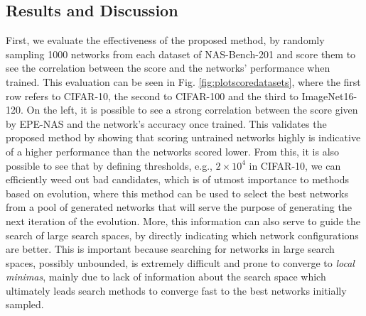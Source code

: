 \documentclass[10pt, conference]{IEEEtran}
\begin{document}
\subsection{Results and Discussion}
First, we evaluate the effectiveness of the proposed method, by randomly sampling 1000 networks from each dataset of NAS-Bench-201 and score them to see the correlation between the score and the networks' performance when trained. This evaluation can be seen in Fig. \ref{fig:plotscoredatasets}, where the first row refers to CIFAR-10, the second to CIFAR-100 and the third to ImageNet16-120. On the left, it is possible to see a strong correlation between the score given by EPE-NAS and the network's accuracy once trained. This validates the proposed method by showing that scoring untrained networks highly is indicative of a higher performance than the networks scored lower. From this, it is also possible to see that by defining thresholds, e.g., $2\times10^4$ in CIFAR-10, we can efficiently weed out bad candidates, which is of utmost importance to methods based on evolution, where this method can be used to select the best networks from a pool of generated networks that will serve the purpose of generating the next iteration of the evolution. More, this information can also serve to guide the search of large search spaces, by directly indicating which network configurations are better. This is important because searching for networks in large search spaces, possibly unbounded, is extremely difficult and prone to converge to \textit{local minimas}, mainly due to lack of information about the search space which ultimately leads search methods to converge fast to the best networks initially sampled.
\end{document}
